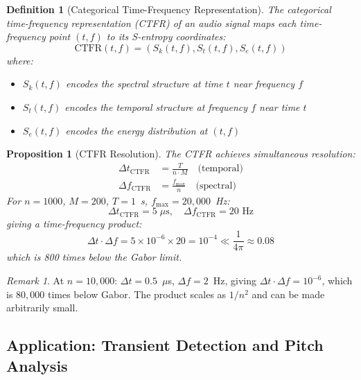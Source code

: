\documentclass[twocolumn,10pt]{article}
\newtheorem{proposition}[theorem]{Proposition}
\newtheorem{definition}[theorem]{Definition}
\theoremstyle{remark}
\newtheorem{remark}[theorem]{Remark}
\newcommand{\Sk}{S_k}
\newcommand{\St}{S_t}
\newcommand{\Se}{S_e}
\begin{document}
\begin{definition}[Categorical Time-Frequency Representation]
\label{def:categorical_tf}
The categorical time-frequency representation (CTFR) of an audio signal maps each time-frequency point $(t, f)$ to its S-entropy coordinates:
\begin{equation}
    \mathrm{CTFR}(t, f) = (\Sk(t, f), \St(t, f), \Se(t, f))
    \label{eq:ctfr}
\end{equation}
where:
\begin{itemize}
    \item $\Sk(t, f)$ encodes the spectral structure at time $t$ near frequency $f$
    \item $\St(t, f)$ encodes the temporal structure at frequency $f$ near time $t$
    \item $\Se(t, f)$ encodes the energy distribution at $(t, f)$
\end{itemize}
\end{definition}

\begin{proposition}[CTFR Resolution]
\label{prop:ctfr_resolution}
The CTFR achieves simultaneous resolution:
\begin{align}
    \Delta t_{\mathrm{CTFR}} &= \frac{T}{n \cdot M} \quad \text{(temporal)} \\
    \Delta f_{\mathrm{CTFR}} &= \frac{f_{\max}}{n} \quad \text{(spectral)}
\end{align}
For $n = 1000$, $M = 200$, $T = 1$~s, $f_{\max} = 20{,}000$~Hz:
\begin{equation}
    \Delta t_{\mathrm{CTFR}} = 5 \; \mu\text{s}, \quad \Delta f_{\mathrm{CTFR}} = 20 \text{ Hz}
\end{equation}
giving a time-frequency product:
\begin{equation}
    \Delta t \cdot \Delta f = 5 \times 10^{-6} \times 20 = 10^{-4} \ll \frac{1}{4\pi} \approx 0.08
\end{equation}
which is 800 times below the Gabor limit.
\end{proposition}

\begin{remark}
At $n = 10{,}000$: $\Delta t = 0.5$~$\mu$s, $\Delta f = 2$~Hz, giving $\Delta t \cdot \Delta f = 10^{-6}$, which is $80{,}000$ times below Gabor. The product scales as $1/n^2$ and can be made arbitrarily small.
\end{remark}

\subsection{Application: Transient Detection and Pitch Analysis}
\end{document}

